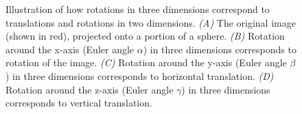 \documentclass{pnastwo}
\begin{document}
\begin{figure}
\begin{minipage}{0.22\textwidth}
\end{minipage}
\caption{Illustration of how rotations in three dimensions correspond to translations and rotations in two dimensions. {\it (A)} The original image (shown in red), projected onto a portion of a sphere. {\it (B)} Rotation around the x-axis (Euler angle $\alpha$) in three dimensions corresponds to rotation of the image. {\it (C)} Rotation around the y-axis (Euler angle $\beta$) in three dimensions corresponds to horizontal translation. {\it (D)} Rotation around the z-axis (Euler angle $\gamma$) in three dimensions corresponds to vertical translation.}
\label{fig:SO3_picture}
\end{figure}

\begin{figure}
\end{figure}
\end{document}
